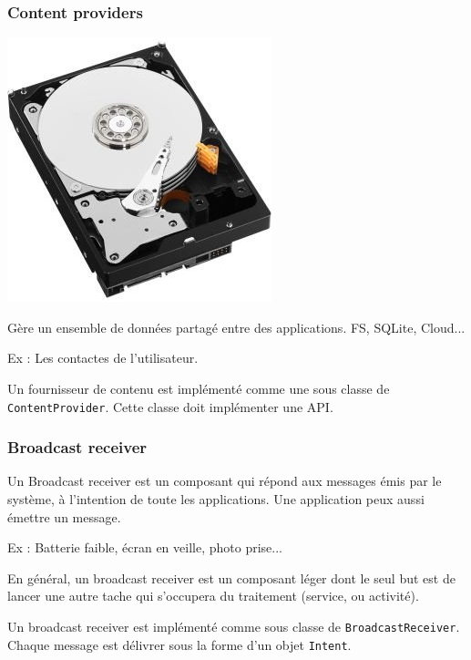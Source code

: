 \documentclass{beamer}
\begin{document}
\begin{frame}
\frametitle{Content providers}


\begin{center}
\includegraphics[scale=0.3]{c-content.jpg}
\end{center}


\begin{block}{}
Gère un ensemble de données partagé entre des applications. FS, SQLite, Cloud...

Ex : Les contactes de l'utilisateur.
\end{block}

\begin{block}{}
Un fournisseur de contenu  est implémenté comme une sous classe de \verb!ContentProvider!. Cette classe doit implémenter une API.
\end{block}
\end{frame}

\begin{frame}
\frametitle{Broadcast receiver}
\begin{block}{}
Un Broadcast receiver est un composant qui répond aux messages émis par le système, à l'intention de toute les applications. Une application peux aussi émettre un message.

Ex : Batterie faible, écran en veille, photo prise...
\end{block}

\begin{block}{}
En général, un broadcast receiver est un composant léger dont le seul but est de lancer une autre tache qui s'occupera du traitement (service, ou activité).
\end{block}

\begin{block}{}
Un broadcast receiver est implémenté comme sous classe de \verb!BroadcastReceiver!. Chaque message est délivrer sous la forme d'un objet \verb!Intent!.
\end{block}
\end{frame}
\end{document}
